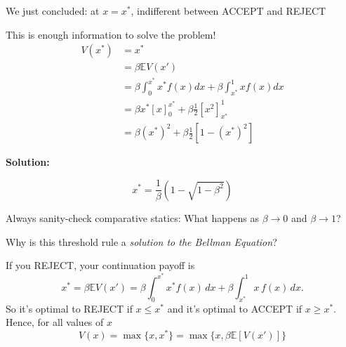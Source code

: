 \documentclass[11pt, aspectratio=169]{beamer}
\newenvironment{witemize}{\itemize\addtolength{\itemsep}{10pt}}{\enditemize}
\begin{document}
\begin{frame}{}

\vspace{6mm}
\begin{witemize}
\item We just concluded: at $x = x^*$, indifferent between ACCEPT and REJECT

\item This is enough information to solve the problem!
\end{witemize}
\begin{align*}
	V(x^*) &= x^* \\
	&= \beta \mathbb{E} V(x') \\
	&= \beta \int_0^{x^*} x^* f(x) dx + \beta \int_{x^*}^1 x f(x) dx \\
	&= \beta x^*  [x]_0^{x^*} + \beta \frac{1}{2} [x^2]_{x^*}^1 \\
	&= \beta (x^*)^2 + \beta \frac{1}{2} [1 - (x^*)^2]
\end{align*}

\vspace{5mm}
\textbf{Solution:} 

\vspace{-10.4mm}
\begin{equation*}
	x^* = \frac{1}{\beta} (1 - \sqrt{1 - \beta^2})
\end{equation*}

	{\footnotesize Always sanity-check comparative statics: What happens as $\beta \to 0$ and $\beta \to 1$?}

\end{frame}


\begin{frame}{}

Why is this threshold rule a \textit{solution to the Bellman Equation}?

If you REJECT, your continuation payoff is 
\begin{equation*}
	x^* = \beta \mathbb E V(x') = \beta \int_0^{x^*} x^* f(x) \, dx + \beta \int_{x^*}^1 x \, f(x) \, dx. 
\end{equation*}
So it's optimal to REJECT if $x \leq x^*$ and it's optimal to ACCEPT if $x \geq x^*$. Hence, for all values of $x$
\begin{equation*}
	V(x) = \max \{x, x^*\} = \max \{x, \beta \mathbb E[ V(x') ]\} 
\end{equation*}

\end{frame}
\end{document}
